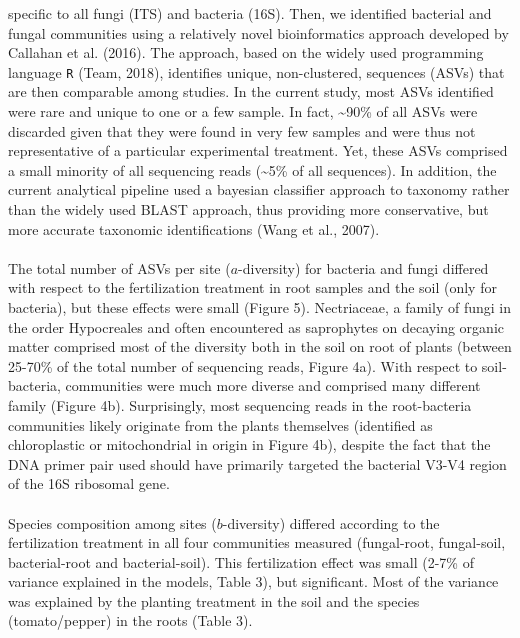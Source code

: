 \documentclass[11pt,]{article}
\begin{document}
specific to all fungi (ITS) and bacteria (16S). Then, we identified
bacterial and fungal communities using a relatively novel bioinformatics
approach developed by Callahan et al. (2016). The approach, based on the
widely used programming language \texttt{R} (Team, 2018), identifies
unique, non-clustered, sequences (ASVs) that are then comparable among
studies. In the current study, most ASVs identified were rare and unique
to one or a few sample. In fact, \textasciitilde{}90\% of all ASVs were
discarded given that they were found in very few samples and were thus
not representative of a particular experimental treatment. Yet, these
ASVs comprised a small minority of all sequencing reads
(\textasciitilde{}5\% of all sequences). In addition, the current
analytical pipeline used a bayesian classifier approach to taxonomy
rather than the widely used BLAST approach, thus providing more
conservative, but more accurate taxonomic identifications (Wang et al.,
2007).\\
\hspace*{0.333em}\\
The total number of ASVs per site (\(a\)-diversity) for bacteria and
fungi differed with respect to the fertilization treatment in root
samples and the soil (only for bacteria), but these effects were small
(Figure 5). Nectriaceae, a family of fungi in the order Hypocreales and
often encountered as saprophytes on decaying organic matter comprised
most of the diversity both in the soil on root of plants (between
25-70\% of the total number of sequencing reads, Figure 4a). With
respect to soil-bacteria, communities were much more diverse and
comprised many different family (Figure 4b). Surprisingly, most
sequencing reads in the root-bacteria communities likely originate from
the plants themselves (identified as chloroplastic or mitochondrial in
origin in Figure 4b), despite the fact that the DNA primer pair used
should have primarily targeted the bacterial V3-V4 region of the 16S
ribosomal gene.\\
\hspace*{0.333em}\\
Species composition among sites (\(b\)-diversity) differed according to
the fertilization treatment in all four communities measured
(fungal-root, fungal-soil, bacterial-root and bacterial-soil). This
fertilization effect was small (2-7\% of variance explained in the
models, Table 3), but significant. Most of the variance was explained by
the planting treatment in the soil and the species (tomato/pepper) in
the roots (Table 3).\\
\end{document}
